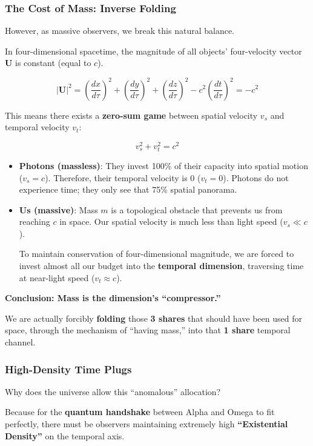 \subsubsection{The Cost of Mass: Inverse Folding}

However, as massive observers, we break this natural balance.

In four-dimensional spacetime, the magnitude of all objects' four-velocity vector $\mathbf{U}$ is constant (equal to $c$).

\[|\mathbf{U}|^2 = \left(\frac{dx}{d\tau}\right)^2 + \left(\frac{dy}{d\tau}\right)^2 + \left(\frac{dz}{d\tau}\right)^2 - c^2\left(\frac{dt}{d\tau}\right)^2 = -c^2\]

This means there exists a \textbf{zero-sum game} between spatial velocity $v_s$ and temporal velocity $v_t$:

\[v_s^2 + v_t^2 = c^2\]

\begin{itemize}
\item \textbf{Photons (massless)}: They invest 100\% of their capacity into spatial motion ($v_s = c$). Therefore, their temporal velocity is 0 ($v_t = 0$). Photons do not experience time; they only see that 75\% spatial panorama.

\item \textbf{Us (massive)}: Mass $m$ is a topological obstacle that prevents us from reaching $c$ in space. Our spatial velocity is much less than light speed ($v_s \ll c$).

To maintain conservation of four-dimensional magnitude, we are forced to invest almost all our budget into the \textbf{temporal dimension}, traversing time at near-light speed ($v_t \approx c$).
\end{itemize}

\textbf{Conclusion: Mass is the dimension's ``compressor.''}

We are actually forcibly \textbf{folding} those \textbf{3 shares} that should have been used for space, through the mechanism of ``having mass,'' into that \textbf{1 share} temporal channel.

\subsubsection{High-Density Time Plugs}

Why does the universe allow this ``anomalous'' allocation?

Because for the \textbf{quantum handshake} between Alpha and Omega to fit perfectly, there must be observers maintaining extremely high \textbf{``Existential Density''} on the temporal axis.

